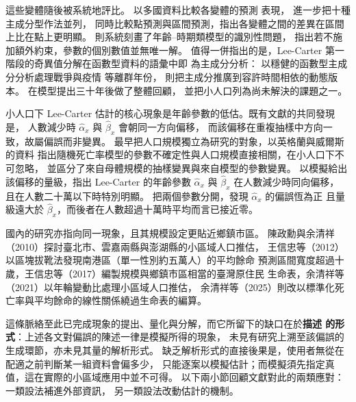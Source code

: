 這些變體隨後被系統地評比。\citet{booth2006} 以多國資料比較各變體的預測
表現，\citet{shang2011} 進一步把十種主成分型作法並列，
同時比較點預測與區間預測，指出各變體之間的差異在區間上比在點上更明顯。
\citet{hunt2020} 則系統刻畫了年齡--時期類模型的識別性問題，
指出若不施加額外約束，參數的個別數值並無唯一解。
值得一併指出的是，Lee-Carter 第一階段的奇異值分解在函數型資料的語彙中即
為主成分分析：\citet{hyndman2007} 以穩健的函數型主成分分析處理戰爭與疫情
等離群年份，\citet{hormann2015} 則把主成分推廣到容許時間相依的動態版本。
\citet{basellini2023} 在模型提出三十年後做了整體回顧，
並把小人口列為尚未解決的課題之一。

小人口下 Lee-Carter 估計的核心現象是年齡參數的低估。既有文獻的共同發現是，
人數減少時 $\hat\alpha_x$ 與 $\hat\beta_x$ 會朝同一方向偏移，
而該偏移在重複抽樣中方向一致，故屬偏誤而非變異。
\citet{chen2017} 最早把人口規模獨立為研究的對象，以英格蘭與威爾斯的資料
指出隨機死亡率模型的參數不確定性與人口規模直接相關，在小人口下不可忽略，
並區分了來自母體規模的抽樣變異與來自模型的參數變異。
\citet{wang2018} 以模擬給出該偏移的量級，指出 Lee-Carter 的年齡參數
$\hat\alpha_x$ 與 $\hat\beta_x$ 在人數減少時同向偏移，
且在人數二十萬以下時特別明顯。
\citet[Figure 1]{yue2019} 把兩個參數分開，發現 $\hat\alpha_x$ 的偏誤恆為正
且量級遠大於 $\hat\beta_x$，而後者在人數超過十萬時平均而言已接近零。

國內的研究亦指向同一現象，且其規模設定更貼近鄉鎮市區。
陳政勳與余清祥（2010）探討臺北市、雲嘉兩縣與澎湖縣的小區域人口推估，
王信忠等（2012）以區塊拔靴法發現南港區（單一性別約五萬人）的平均餘命
預測區間寬度超過十歲，王信忠等（2017）編製規模與鄉鎮市區相當的臺灣原住民
生命表，余清祥等（2021）以年輪變動比處理小區域人口推估，
余清祥等（2025）則改以標準化死亡率與平均餘命的線性關係繞過生命表的編算。

這條脈絡至此已完成現象的提出、量化與分解，而它所留下的缺口在於\textbf{描述
的形式}：上述各文對偏誤的陳述一律是模擬所得的現象，
未見有研究上溯至該偏誤的生成環節，亦未見其量的解析形式。
缺乏解析形式的直接後果是，使用者無從在配適之前判斷某一組資料會偏多少，
只能逐案以模擬估計；而模擬須先指定真值，這在實際的小區域應用中並不可得。
以下兩小節回顧文獻對此的兩類應對：一類設法補進外部資訊，
另一類設法改動估計的機制。
